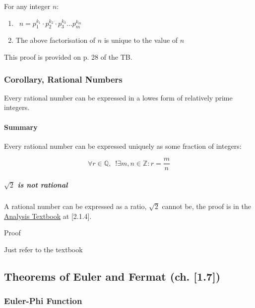 \documentclass[
]{article}
\begin{document}
For any integer \(n\):

\begin{enumerate}
\def\labelenumi{\arabic{enumi}.}
\item
  \(\enspace n = p^{k_1}_1\cdot p^{k_2}_2 \cdot p^{k_3}_3 \dots p^{k_m}_m\)
\item
  The above factorisation of \(n\) is unique to the value of \(n\)
\end{enumerate}

This proof is provided on p. 28 of the TB.

\hypertarget{header-n234}{%
\subsubsection{Corollary, Rational Numbers}\label{header-n234}}

Every rational number can be expressed in a lowes form of relatively
prime integers.

\hypertarget{header-n236}{%
\paragraph{Summary}\label{header-n236}}

Every rational number can be expressed uniquely as some fraction of
integers:

\[\forall r \in \mathbb{Q}, \enspace !\exists m,n \in \mathbb{Z} : r = \frac{m}{n}\]

\hypertarget{header-n239}{%
\subparagraph{\texorpdfstring{\(\sqrt{2}\) is not
rational}{\textbackslash sqrt\{2\} is not rational}}\label{header-n239}}

A rational number can be expressed as a ratio, \(\sqrt{2}\) cannot be,
the proof is in the
\href{http://booksdl.org/get.php?md5=ef3626243a81006414e1f5a67ce694e0}{Analysis
Textbook} at {[}2.1.4{]}.

Proof

Just refer to the textbook

\hypertarget{header-n243}{%
\subsection{Theorems of Euler and Fermat (ch.
{[}1.7{]})}\label{header-n243}}

\hypertarget{header-n245}{%
\subsubsection{Euler-Phi Function}\label{header-n245}}
\end{document}
